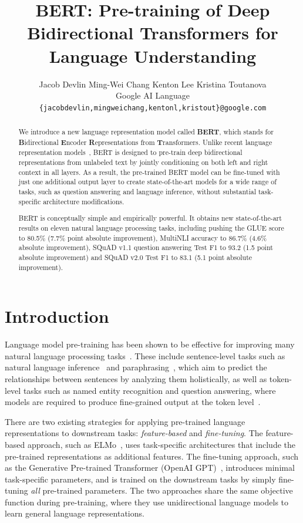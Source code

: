 \documentclass[11pt,a4paper]{article}
\title{\textbf{BERT}: Pre-training of Deep Bidirectional Transformers for \\ Language Understanding}
\author{Jacob Devlin \quad Ming-Wei Chang \quad Kenton Lee \quad Kristina Toutanova \\
  Google AI Language \\
  {\tt \{jacobdevlin,mingweichang,kentonl,kristout\}@google.com} \\}
\date{}
\newcommand\bert{BERT\xspace}
\begin{document}
\maketitle
\begin{abstract}
We introduce a new language representation model called {\bf \bert}, which stands for \textbf{B}idirectional \textbf{E}ncoder \textbf{R}epresentations from \textbf{T}ransformers. Unlike recent language representation models~\cite{peters-etal:2018:_deep, radford-etal:2018},  \bert is designed to pre-train deep bidirectional representations from unlabeled text by jointly conditioning on both left and right context in all layers. As a result, the pre-trained BERT model can be fine-tuned with just one additional output layer to create state-of-the-art models for a wide range of tasks, such as question answering and language inference, without substantial task-specific architecture modifications. 

\bert is conceptually simple and empirically powerful. It obtains new state-of-the-art results on eleven natural language processing tasks, including pushing the GLUE score to 80.5\% (7.7\% point absolute improvement), MultiNLI accuracy to 86.7\% (4.6\% absolute improvement), SQuAD v1.1 question answering Test F1 to 93.2 (1.5 point absolute improvement) and SQuAD v2.0 Test F1 to 83.1 (5.1 point absolute improvement).

\end{abstract}

\section{Introduction}

Language model pre-training has been shown to be effective for improving many natural language processing tasks~\cite{dai-le:2015:_semi, peters-etal:2018:_deep, radford-etal:2018, howard-ruder:2018}. These include sentence-level tasks such as natural language inference~\cite{bowman-etal:2015, williams-nangia-bowman:2018} and paraphrasing~\cite{dolan-brockett:2005:_autom}, which aim to predict the relationships between sentences by analyzing them holistically, as well as token-level tasks such as named entity recognition and question answering, where models are required to produce fine-grained output at the token level~\cite{tjong-de:2003, rajpurkar-etal:2016:_squad}.

There are two existing strategies for applying pre-trained language representations to downstream tasks: {\em feature-based} and {\em fine-tuning}. The feature-based approach, such as ELMo~\cite{peters-etal:2018:_deep}, uses task-specific architectures that include the pre-trained representations as additional features. The fine-tuning approach, such as the Generative Pre-trained Transformer (OpenAI GPT)~\cite{radford-etal:2018}, introduces minimal task-specific parameters, and is trained on the downstream tasks by simply fine-tuning {\em all} pre-trained parameters. The two approaches share the same objective function during pre-training, where they use unidirectional language models to learn general language representations.
\end{document}

